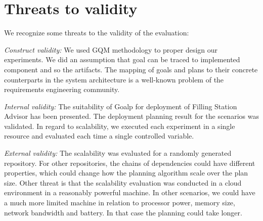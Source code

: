 \section{Threats to validity}

We recognize some threats to the validity of the evaluation:

\emph{Construct validity:}
We used GQM methodology to proper design our experiments. We did an assumption that goal can be traced to implemented component and so the artifacts. The mapping of goals and plans to their concrete counterparts in the system architecture is a well-known problem of the requirements engineering community.

\emph{Internal validity:}
The suitability of Goalp for deployment of Filling Station Advisor has been presented. The deployment planning result for the scenarios was validated.
In regard to scalability, we executed each experiment in a single resource and evaluated each time a single controlled variable.

\emph{External validity:}
The scalability was evaluated for a randomly generated repository. For other repositories, the chains of dependencies could have different properties, which could change how the planning algorithm scale over the plan size.
Other threat is that the scalability evaluation was conducted in a cloud environment in a reasonably powerful machine. In other scenarios, we could have a much more limited machine in relation to processor power, memory size, network bandwidth and battery. In that case the planning could take longer.
